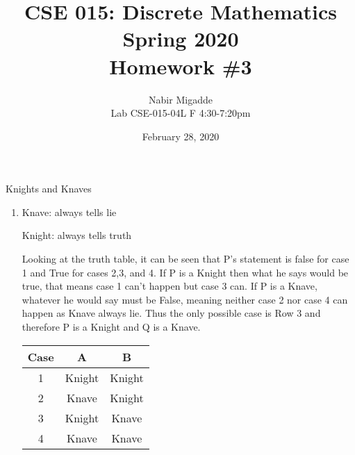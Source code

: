 \documentclass[11pt]{article}
\begin{document}
\author{Nabir Migadde\\
Lab CSE-015-04L F 4:30-7:20pm}

\title{CSE 015: Discrete Mathematics\\
Spring 2020\\
Homework \#3\\}

\date{February 28, 2020}
\maketitle

Knights and Knaves

\begin{enumerate}

\begin{center}
\begin{tabular}{|c|c|c|}
\hline
Case & P & Q \\
\hline
1 & Knight & Knight \\
2 & Knave & Knight \\
3 & Knight & Knave \\
4 & Knave & Knave \\
\hline
\end{tabular}
\end{center}

\item
Knave: always tells lie

Knight: always tells truth

Looking at the truth table, it can be seen that P's statement is false for case 1 and True for cases 2,3, and 4. If P is a Knight then what he says would be true, that means case 1 can't happen but case 3 can. If P is a Knave, whatever he would say must be False, meaning neither case 2 nor case 4 can happen as Knave always lie. Thus the only possible case is Row 3 and therefore P is a Knight and Q is a Knave.

\begin{center}
\begin{tabular}{|c|c|c|}
\hline
Case & A & B \\
\hline
1 & Knight & Knight \\
2 & Knave & Knight \\
3 & Knight & Knave \\
4 & Knave & Knave \\
\hline
\end{tabular}
\end{center}


\end{enumerate}
\end{document}
